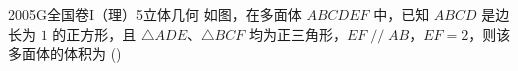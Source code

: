 
\begin{problem}{2005}{G}{全国卷I（理）}{5}{立体几何}
如图，在多面体 $ ABCDEF $ 中，已知 $ ABCD $ 是边长为 $ 1 $ 的正方形，且 $ \triangle ADE $、$ \triangle BCF $ 均为正三角形，$ EF\mathop{//}AB $，$ EF=2 $，则该多面体的体积为 (\hspace{1cm})
\begin{choices}
\end{choices}
\end{problem}

\begin{answer}

\end{answer}

\begin{solutions}

\end{solutions}